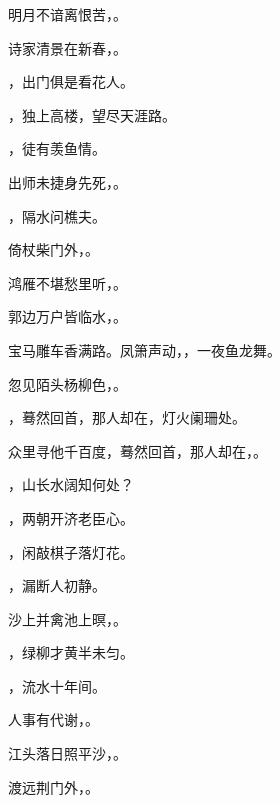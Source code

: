 \documentclass[12pt, a4paper, addpoints]{exam}
\begin{document}
\begin{multicols}{2}
\begin{questions}
\question[2] 明月不谙离恨苦，\uline{\qquad\qquad\qquad\qquad}。

\question[2] 诗家清景在新春，\uline{\qquad\qquad\qquad\qquad}。

\question[2] \uline{\qquad\qquad\qquad\qquad}，出门俱是看花人。

\question[2] \uline{\qquad\qquad\qquad\qquad}，独上高楼，望尽天涯路。

\question[2] \uline{\qquad\qquad\qquad\qquad}，徒有羡鱼情。

\question[2] 出师未捷身先死，\uline{\qquad\qquad\qquad\qquad}。

\question[2] \uline{\qquad\qquad\qquad\qquad}，隔水问樵夫。

\question[2] 倚杖柴门外，\uline{\qquad\qquad\qquad\qquad}。

\question[1] 鸿雁不堪愁里听，\uline{\qquad\qquad\qquad\qquad}。

\question[2] 郭边万户皆临水，\uline{\qquad\qquad\qquad\qquad}。

\question[2] 宝马雕车香满路。凤箫声动，\uline{\qquad\qquad\qquad\qquad}，一夜鱼龙舞。

\question[2] 忽见陌头杨柳色，\uline{\qquad\qquad\qquad\qquad}。

\question[2] \uline{\qquad\qquad\qquad\qquad}，蓦然回首，那人却在，灯火阑珊处。

\question[2] 众里寻他千百度，蓦然回首，那人却在，\uline{\qquad\qquad\qquad\qquad}。

\question[2] \uline{\qquad\qquad\qquad\qquad}，山长水阔知何处？

\question[2] \uline{\qquad\qquad\qquad\qquad}，两朝开济老臣心。

\question[2] \uline{\qquad\qquad\qquad\qquad}，闲敲棋子落灯花。

\question[2] \uline{\qquad\qquad\qquad\qquad}，漏断人初静。

\question[2] 沙上并禽池上暝，\uline{\qquad\qquad\qquad\qquad}。

\question[2] \uline{\qquad\qquad\qquad\qquad}，绿柳才黄半未匀。

\question[1] \uline{\qquad\qquad\qquad\qquad}，流水十年间。

\question[2] 人事有代谢，\uline{\qquad\qquad\qquad\qquad}。

\question[2] 江头落日照平沙，\uline{\qquad\qquad\qquad\qquad}。

\question[2] 渡远荆门外，\uline{\qquad\qquad\qquad\qquad}。


\end{questions}
\end{multicols}
\end{document}
